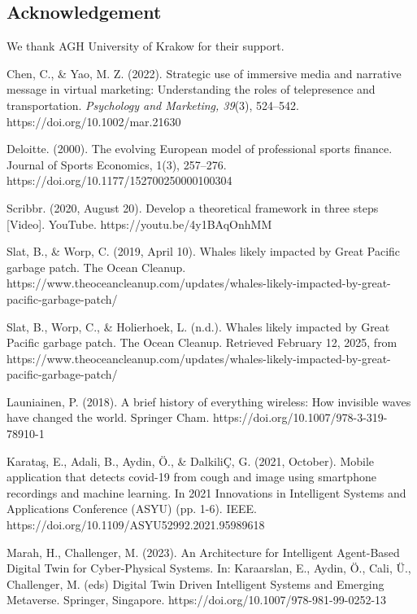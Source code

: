 \documentclass[a4paper]{article}
\begin{document}
\begin{multicols}{2}
\section*{Acknowledgement}
We thank AGH University of Krakow for their support.

\begin{thebibliography}{8}
 Chen, C., \& Yao, M. Z. (2022). Strategic use of immersive media and narrative message in virtual marketing: Understanding the roles of telepresence and transportation. \textit{Psychology and Marketing, 39}(3), 524–542. https://doi.org/10.1002/mar.21630

 Deloitte. (2000). The evolving European model of professional sports finance. Journal of Sports Economics, 1(3), 257–276. https://doi.org/10.1177/152700250000100304

 Scribbr. (2020, August 20). Develop a theoretical framework in three steps [Video]. YouTube. https://youtu.be/4y1BAqOnhMM

 Slat, B., \& Worp, C. (2019, April 10). Whales likely impacted by Great Pacific garbage patch. The Ocean Cleanup. https://www.theoceancleanup.com/updates/whales-likely-impacted-by-great-pacific-garbage-patch/

 Slat, B., Worp, C., \& Holierhoek, L. (n.d.). Whales likely impacted by Great Pacific garbage patch. The Ocean Cleanup. Retrieved February 12, 2025, from https://www.theoceancleanup.com/updates/whales-likely-impacted-by-great-pacific-garbage-patch/

 Launiainen, P. (2018). A brief history of everything wireless: How invisible waves have changed the world. Springer Cham. https://doi.org/10.1007/978-3-319-78910-1

 Karataş, E., Adali, B., Aydin, Ö., \& DalkiliÇ, G. (2021, October). Mobile application that detects covid-19 from cough and image using smartphone recordings and machine learning. In 2021 Innovations in Intelligent Systems and Applications Conference (ASYU) (pp. 1-6). IEEE. https://doi.org/10.1109/ASYU52992.2021.95989618

 Marah, H., Challenger, M. (2023). An Architecture for Intelligent Agent-Based Digital Twin for Cyber-Physical Systems. In: Karaarslan, E., Aydin, Ö., Cali, Ü., Challenger, M. (eds) Digital Twin Driven Intelligent Systems and Emerging Metaverse. Springer, Singapore. https://doi.org/10.1007/978-981-99-0252-13

\end{thebibliography}

\end{multicols}
\end{document}

